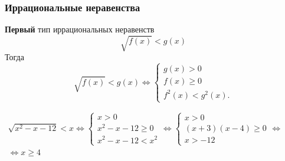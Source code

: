 \documentclass[]{scrartcl}
\begin{document}
\subsubsection{Иррациональные неравенства}
\textbf{Первый} тип иррациональных неравенств
	\begin{equation}\label{eq:irrational-inequal-1}
	\sqrt{f(x)}<g(x)
	\end{equation}
Тогда
\begin{equation}\label{eq:irrational-inequal-2}
\sqrt{f(x)}<g(x) \Leftrightarrow
\begin{cases}
g(x)>0\\
f(x)\geq 0\\
f^2(x)<g^2(x).
\end{cases}
\end{equation}

\begin{Thexmpl}\label{ex:irrational-inequal-1}
	
	$\begin{aligned}
	\sqrt{x^2-x-12}<x
	\Leftrightarrow
	\begin{cases}
	x>0\\
	x^2-x-12\geq 0\\
	x^2-x-12<x^2
	\end{cases}
	\Leftrightarrow
	\begin{cases}
	x>0\\
	(x+3)(x-4)\geq 0\\
	x>-12
	\end{cases}
	\Leftrightarrow\\
	\Leftrightarrow
	x\geq 4
	\end{aligned}$
\end{Thexmpl}
\end{document}
